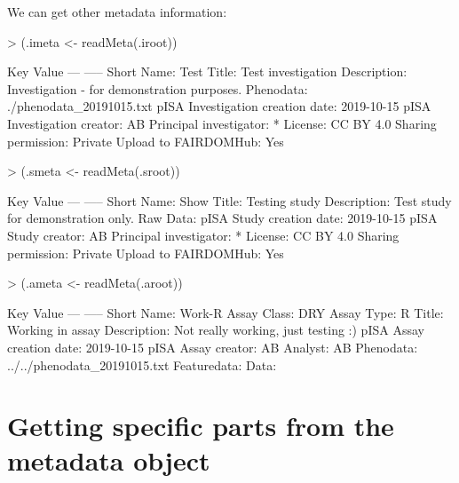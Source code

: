 \documentclass[a4paper,12pt]{article}\usepackage[]{graphicx}\usepackage[]{color}
\begin{document}
We can get other metadata information:

\begin{Schunk}
\begin{Sinput}
> (.imeta <- readMeta(.iroot))
\end{Sinput}
\begin{Soutput}
 Key                               Value
 ---                              -----
 Short Name:                         Test
 Title:                              Test investigation
 Description:                        Investigation - for demonstration purposes.
 Phenodata:                          ./phenodata_20191015.txt
 pISA Investigation creation date:   2019-10-15
 pISA Investigation creator:         AB
 Principal investigator:             *
 License:                            CC BY 4.0
 Sharing permission:                 Private
 Upload to FAIRDOMHub:               Yes
\end{Soutput}
\begin{Sinput}
> (.smeta <- readMeta(.sroot))
\end{Sinput}
\begin{Soutput}
 Key                         Value
 ---                         -----
 Short Name:                 Show
 Title:                      Testing study
 Description:                Test study for demonstration only.
 Raw Data:                   
 pISA Study creation date:   2019-10-15
 pISA Study creator:         AB
 Principal investigator:     *
 License:                    CC BY 4.0
 Sharing permission:         Private
 Upload to FAIRDOMHub:       Yes
\end{Soutput}
\begin{Sinput}
> (.ameta <- readMeta(.aroot))
\end{Sinput}
\begin{Soutput}
 Key                         Value
 ---                         -----
 Short Name:                 Work-R
 Assay Class:                DRY
 Assay Type:                 R
 Title:                      Working in assay
 Description:                Not really working, just testing :)
 pISA Assay creation date:   2019-10-15
 pISA Assay creator:         AB
 Analyst:                    AB
 Phenodata:                  ../../phenodata_20191015.txt
 Featuredata:                
 Data:                       
\end{Soutput}
\end{Schunk}

\section{Getting specific parts from the metadata object}
\end{document}
